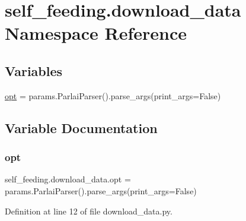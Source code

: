 \hypertarget{namespaceself__feeding_1_1download__data}{}\section{self\+\_\+feeding.\+download\+\_\+data Namespace Reference}
\label{namespaceself__feeding_1_1download__data}
\subsection*{Variables}
\begin{DoxyCompactItemize}
\item 
\hyperlink{namespaceself__feeding_1_1download__data_a6b16c936511c85894316ab5ace3f8ada}{opt} = params.\+Parlai\+Parser().parse\+\_\+args(print\+\_\+args=False)
\end{DoxyCompactItemize}


\subsection{Variable Documentation}
\mbox{\label{namespaceself__feeding_1_1download__data_a6b16c936511c85894316ab5ace3f8ada}} 
\subsubsection{\texorpdfstring{opt}{opt}}
{\footnotesize\ttfamily self\+\_\+feeding.\+download\+\_\+data.\+opt = params.\+Parlai\+Parser().parse\+\_\+args(print\+\_\+args=False)}



Definition at line 12 of file download\+\_\+data.\+py.

